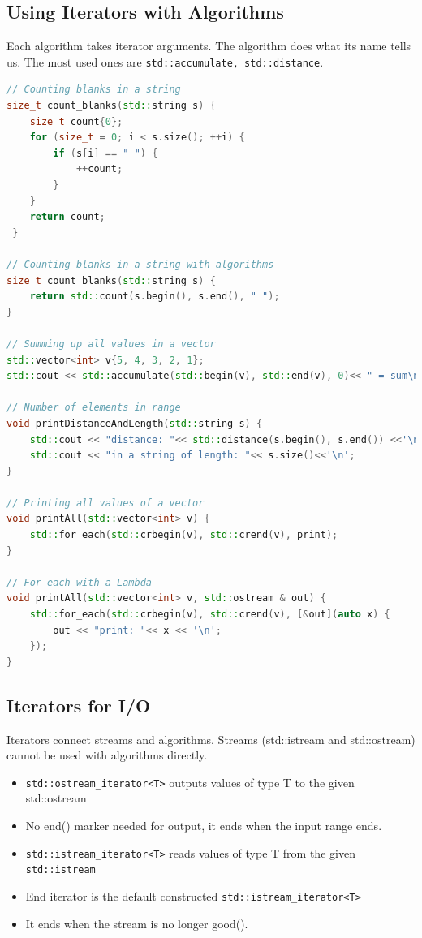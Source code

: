 \subsection{Using Iterators with Algorithms}
 Each algorithm takes iterator arguments. The algorithm does what its name tells us. The most used ones are \lstinline|std::accumulate, std::distance|. 
 
\begin{lstlisting}[language=C++]
// Counting blanks in a string
size_t count_blanks(std::string s) {
 	size_t count{0};
 	for (size_t = 0; i < s.size(); ++i) {
 		if (s[i] == " ") {
 			++count;
 		}
 	}
 	return count;
 }
 
// Counting blanks in a string with algorithms
size_t count_blanks(std::string s) {
	return std::count(s.begin(), s.end(), " ");
}

// Summing up all values in a vector
std::vector<int> v{5, 4, 3, 2, 1}; 
std::cout << std::accumulate(std::begin(v), std::end(v), 0)<< " = sum\n";

// Number of elements in range 
void printDistanceAndLength(std::string s) {
	std::cout << "distance: "<< std::distance(s.begin(), s.end()) <<'\n';
	std::cout << "in a string of length: "<< s.size()<<'\n'; 
} 	

// Printing all values of a vector
void printAll(std::vector<int> v) {
	std::for_each(std::crbegin(v), std::crend(v), print); 
}

// For each with a Lambda
void printAll(std::vector<int> v, std::ostream & out) {
	std::for_each(std::crbegin(v), std::crend(v), [&out](auto x) {
		out << "print: "<< x << '\n';
	});
}

\end{lstlisting}


\subsection{Iterators for I/O}
Iterators connect streams and algorithms.  Streams (std::istream and std::ostream) cannot be used with algorithms directly.

\begin{itemize}
	\itemsep -0.5em 
  	\item \lstinline{std::ostream_iterator<T>} outputs values of type T to the given std::ostream
  	\item No end() marker needed for output, it ends when the input range ends.
  	\item \lstinline|std::istream_iterator<T>| reads values of type T from the given \lstinline|std::istream|
  	\item End iterator is the default constructed \lstinline|std::istream_iterator<T>|
   	\item It ends when the stream is no longer good().
\end{itemize}

